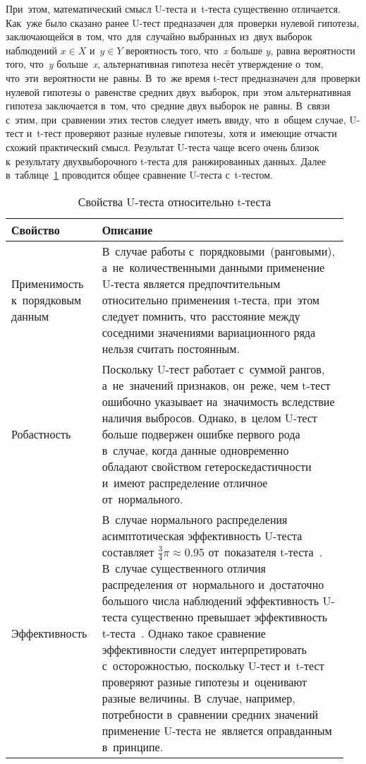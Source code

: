\documentclass[]{scrreprt}
\begin{document}
При~этом, математический смысл U-теста и~t-теста существенно отличается. Как~уже было сказано ранее U-тест предназачен для~проверки нулевой гипотезы, заключающейся в~том, что~для~случайно выбранных из~двух выборок наблюдений ${\textstyle x \in X}$ и~${\textstyle y \in Y}$ вероятность того, что~\textit{x} больше \textit{y}, равна вероятности того, что~\textit{y} больше~\textit{x}, альтернативная гипотеза несёт утверждение о~том, что~эти~вероятности не~равны. В~то~же время t-тест предназначен для~проверки нулевой гипотезы о~равенстве средних двух~выборок, при~этом альтернативная гипотеза заключается в~том, что~средние двух выборок не~равны. В~связи с~этим, при~сравнении этих тестов следует иметь ввиду, что~в~общем случае, U-тест и~t-тест проверяют разные нулевые гипотезы, хотя и~имеющие отчасти схожий практический смысл. Результат U-теста чаще всего очень близок к~результату двухвыборочного t-теста для~ранжированных данных.
Далее в~таблице~\ref{tab:U-test-t-test-comparison} проводится общее сравнение U-теста с~t-тестом.
%
\begin{table}[ht]
	\caption{Свойства U-теста относительно t-теста}  \label{tab:U-test-t-test-comparison}
	\centering
	\begin{tabularx}{\textwidth}{p{0.25\linewidth} p{0.7\linewidth}} 
		\hline
		Свойство&Описание\\
		\hline
		Применимость к~порядковым данным&В~случае работы с~порядковыми~(ранговыми), а~не~количественными данными применение U-теста является предпочтительным относительно применения t-теста, при~этом следует помнить, что~расстояние между соседними значениями вариационного ряда нельзя считать постоянным.\\
		\hline
		Робастность&Поскольку U-тест работает с~суммой рангов, а~не~значений признаков, он~реже, чем t-тест ошибочно указывает на~значимость вследствие наличия выбросов. Однако, в~целом U-тест больше подвержен ошибке первого рода в~случае, когда данные одновременно обладают свойством гетероскедастичности и~имеют распределение отличное от~нормального.\\
		\hline
		Эффективность&В~случае нормального распределения асимптотическая эффективность U-теста составляет $\frac{3}{4}\pi \approx 0.95$ от~показателя t-теста~\cite{U-test-efficiency}. В~случае существенного отличия распределения от~нормального и~достаточно большого числа наблюдений эффективность U-теста существенно превышает эффективность t-теста~\cite{Practical-Nonparametric-Statistics}. Однако такое сравнение эффективности следует интерпретировать с~осторожностью, поскольку U-тест и~t-тест проверяют разные гипотезы и~оценивают разные величины. В~случае, например, потребности в~сравнении средних значений применение U-теста не~является оправданным в~принципе.\\
		\hline
	\end{tabularx}
\end{table}
%
\end{document}

